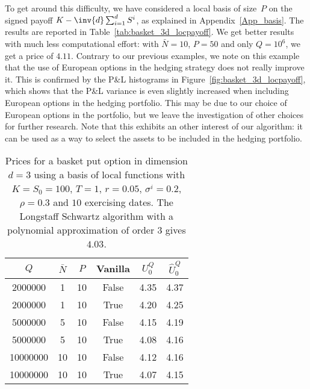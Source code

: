 To get around this difficulty, we have considered a local basis of size~$P$ on the signed payoff  $K - \inv{d}\sum_{i = 1}^d S^i $, as explained in Appendix~\ref{App_basis}. The results are reported in Table~\ref{tab:basket_3d_locpayoff}.  We get better results with much less computational effort: with $\bar{N}=10$, $P=50$ and only $Q=10^6$, we get a price of $4.11$. Contrary to our previous examples, we note on this example that the use of European options in the hedging strategy does not really improve it. This is confirmed by the P\&L histograms in Figure~\ref{fig:basket_3d_locpayoff}, which shows that the P\&L variance is even slightly increased when including European options in the hedging portfolio.  
This may be due to our choice of European options in the portfolio, but we leave the investigation of other choices for further research. Note that this exhibits an other interest of our algorithm: it can be used as a way to select the assets to be included in the hedging portfolio. 





\begin{table}[htb!]
  \centering\begin{tabular}{cccccc}
    \hline
    $Q$ & $\bar{N}$ & $P$ & Vanilla\phantom{$\Big|$} & $U_0^Q$ & $\hat{U}_0^Q$ \\
    \hline
    2000000 & 1 & 10 & False & 4.35 & 4.37 \\
    2000000 & 1 & 10 & True & 4.20 & 4.25 \\
    5000000 & 5 & 10 & False & 4.15 & 4.19 \\
    5000000 & 5 & 10 & True & 4.08 & 4.16 \\
    10000000 & 10 & 10 & False & 4.12 & 4.16 \\
    10000000 & 10 & 10 & True & 4.07 & 4.15 \\
    \hline
    \end{tabular}
  \caption{Prices for a basket put option in dimension $d=3$ using a basis of local functions with $K = S_0 = 100$, $T = 1$, $r=0.05$, $\sigma^i=0.2$, $\rho = 0.3$ and $10$ exercising dates. The Longstaff Schwartz algorithm with a polynomial approximation of order $3$ gives $4.03$.}\label{tab:basket_3d_locasset}
\end{table}

